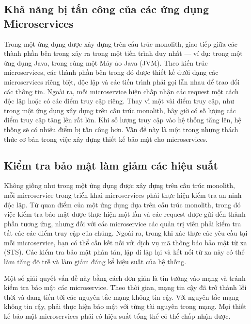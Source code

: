 \documentclass[14pt,a4paper]{report}
\begin{document}
	\subsection{Khả năng bị tấn công của các ứng dụng Microservices}
	{\hspace{1cm}Trong một ứng dụng được xây dựng trên cấu trúc monolith, giao tiếp giữa các thành phần bên trong xảy ra trong một tiến trình duy nhất — ví dụ: trong một ứng dụng Java, trong cùng một Máy ảo Java (JVM). Theo kiến trúc microservices, các thành phần bên trong đó được thiết kế dưới dạng các microservices riêng biệt, độc lập và các tiến trình phải gọi lẫn nhau để trao đổi các thông tin. Ngoài ra, mỗi microservice hiện chấp nhận các request một cách độc lập hoặc có các điểm truy cập riêng. Thay vì một vài điểm truy cập, như trong một ứng dụng xây dựng trên cấu trúc monolith, bây giờ  có số lượng các điểm truy cập tăng lên rất lớn. Khi số lượng truy cập vào hệ thống tăng lên, hệ thống sẽ có nhiều điểm bị tấn công hơn. Vấn đề này là một trong những thách thức cơ bản trong việc xây dựng thiết kế bảo mật cho microservices.\\}
	\subsection{Kiểm tra bảo mật làm giảm các hiệu suất}
	{\hspace{1cm}Không giống như trong một ứng dụng được xây dựng trên cấu trúc monolith, mỗi microservice trong triển khai microservices phải thực hiện kiểm tra an ninh độc lập. Từ quan điểm của một ứng dụng dựa trên cấu trúc monolith, trong đó việc kiểm tra bảo mật được thực hiện một lần và các request được gửi đến thành phần tương ứng, nhưng đối với các microservice các quản trị viên phải kiểm tra tất các các điểm truy cập của chúng. Ngoài ra, trong khi xác thực các yêu cầu tại mỗi microservice, bạn có thể cần kết nối với dịch vụ mã thông báo bảo mật từ xa (STS). Các kiểm tra bảo mật phân tán, lặp đi lặp lại và kết nối từ xa này có thể làm tăng độ trễ và làm giảm đáng kể hiệu suất của hệ thống.\\}
	
	\hspace{0.3cm}Một số giải quyết vấn đề này bằng cách đơn giản là tin tưởng vào mạng và tránh kiểm tra bảo mật các microservice. Theo thời gian, mạng tin cậy đã trở thành lỗi thời và đang tiến tới các nguyên tắc mạng không tin cậy. Với nguyên tắc mạng không tin cậy, phải thực hiện bảo mật với từng tài nguyên trong mạng. Mọi thiết kế bảo mật microservices phải có hiệu suất tổng thể có thể chấp nhận được.
\end{document}
